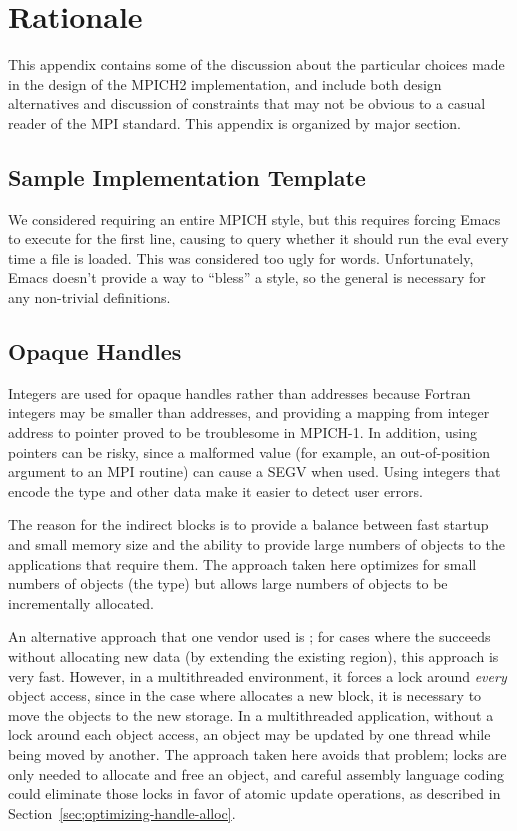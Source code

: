 \documentclass{article}
\begin{document}
\ifrationale
\section{Rationale}
\label{sec:rationale}

This appendix contains some of the discussion about the particular choices
made in the design of the MPICH2 implementation, and include both design
alternatives and discussion of constraints that may not be obvious to a casual
reader of the MPI standard.  This appendix is organized by major section.

\subsection{Sample Implementation Template}

We considered requiring an entire MPICH style, but this requires
forcing Emacs to execute 
 for the first line, causing  to query whether
it should run the eval every time a file is loaded.  This was
considered too ugly for words.  Unfortunately, Emacs doesn't provide a
way to ``bless'' a style, so the general   is necessary for
any non-trivial definitions.

\subsection{Opaque Handles}
\label{sec:rationale-opaque-handles}

Integers are used for opaque handles rather than addresses because
Fortran integers may be smaller than addresses, and providing a
mapping from integer address to pointer proved to be troublesome in
MPICH-1.  In addition, using pointers can be risky, since a malformed
value (for example, an out-of-position argument to an MPI routine) can
cause a SEGV when used.  Using integers that encode the type and other
data make it easier to detect user errors.

The reason for the indirect blocks is to provide a balance between fast
startup and small memory size and the ability to provide large numbers of
objects to the applications that require them.  The approach taken here
optimizes for small numbers of objects (the  type) but
allows large numbers of objects to be incrementally allocated.

An alternative approach that one vendor used is ; for cases
where the  succeeds without allocating new data (by extending
the existing region), this approach is very fast.  However, in a multithreaded
environment, it forces a lock around \emph{every} object access, since in the
case where  allocates a new block, it is necessary to move the
objects to the new storage.  In a multithreaded application, without a lock
around each object access, an object may be updated by one thread while being
moved by another.  The approach taken here avoids that problem; locks are only
needed to allocate and free an object, and careful assembly language coding
could eliminate those locks in favor of atomic update operations, as
described in Section~\ref{sec;optimizing-handle-alloc}.
\end{document}
